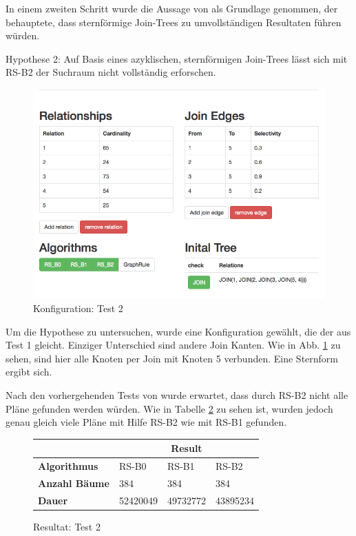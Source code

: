 In einem zweiten Schritt wurde die Aussage von \cite{shanbhag2014optimizing} als Grundlage genommen, der behauptete, dass sternförmige Join-Trees zu umvollständigen Resultaten führen würden.

Hypothese 2: Auf Basis eines azyklischen, sternförmigen Join-Trees lässt sich mit RS-B2 der Suchraum nicht vollständig erforschen.

\begin{figure}[ht]
  \centering
  \includegraphics[width=\textwidth]{05_ResultsEvaluation/00_media/Test2.png}
  \caption{Konfiguration: Test 2}
  \label{Konfiguration:Test2}
\end{figure}


Um die Hypothese zu untersuchen, wurde eine Konfiguration gewählt, die der aus Test 1 gleicht. Einziger Unterschied sind andere Join Kanten. Wie in  Abb. \ref{Konfiguration:Test2} zu sehen, sind hier alle Knoten per Join mit Knoten 5 verbunden. Eine Sternform ergibt sich.

Nach den vorhergehenden Tests von \cite{shanbhag2014optimizing} wurde erwartet, dass durch RS-B2 nicht alle Pläne gefunden werden würden. Wie in Tabelle \ref{Result:Test2} zu sehen ist, wurden jedoch genau gleich viele Pläne mit Hilfe RS-B2 wie mit RS-B1 gefunden. 

\begin{figure}[ht]
\centering

\begin{tabular}{|l|l|l|l|}
\hline
                         & \multicolumn{3}{c|}{{\bf Result}} \\ \hline
{\bf Algorithmus}        & RS-B0     & RS-B1     & RS-B2     \\ \hline
{\bf Anzahl Bäume}       & 384       & 384       & 384       \\ \hline
{\bf Dauer}              & 52420049  & 49732772  & 43895234  \\ \hline
\end{tabular}

\caption{Resultat: Test 2}
\label{Result:Test2}
\end{figure}


